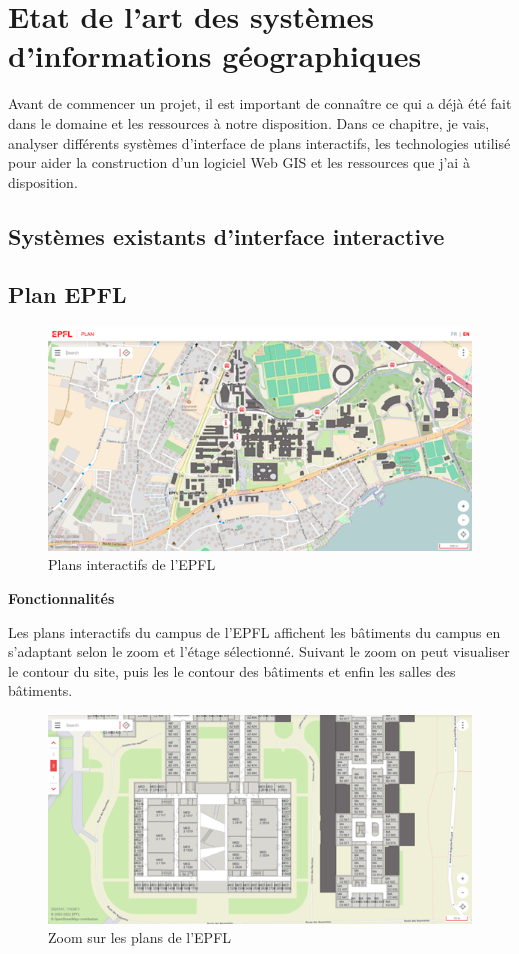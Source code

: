 \documentclass[
    iai, %
    il, %
]{heig-tb}
\begin{document}
\section{Etat de l'art des systèmes d'informations géographiques}
Avant de commencer un projet, il est important de connaître ce qui a déjà été fait dans le domaine et les ressources à notre disposition.
Dans ce chapitre, je vais, analyser différents systèmes d'interface de plans interactifs,
les technologies utilisé pour aider la construction d'un logiciel Web GIS et les ressources que j'ai à disposition.

\subsection{Systèmes existants d'interface interactive}

\subsection{Plan EPFL}
\begin{figure}[H]
    \caption{Plans interactifs de l'EPFL}
    \centering
    \includegraphics{planEPFL.png}
\end{figure}

\textbf{Fonctionnalités}

Les plans interactifs du campus de l'EPFL \cite{plan-epfl} affichent les bâtiments du campus en s'adaptant selon le zoom et l'étage sélectionné.
Suivant le zoom on peut visualiser le contour du site, puis les le contour des bâtiments et enfin les salles des bâtiments.

\begin{figure}[H]
    \caption{Zoom sur les plans de l'EPFL }
    \centering
    \includegraphics{planEPFLGrosPlan.png}
\end{figure}
\end{document}

